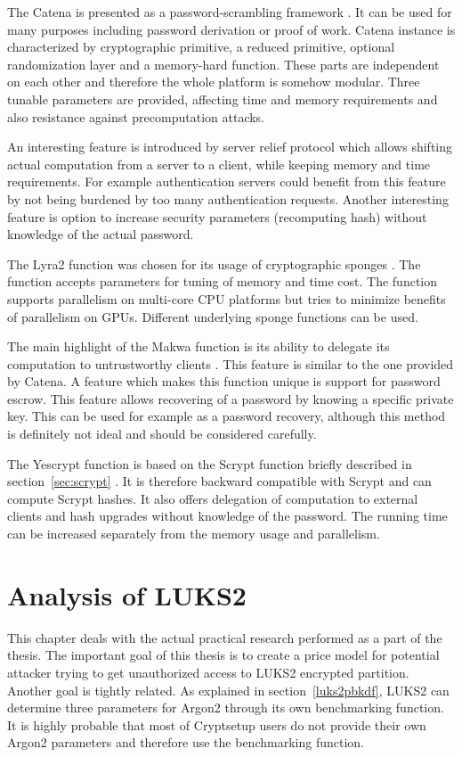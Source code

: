 \documentclass[nolof,digital]{fithesis3}
\begin{document}
The Catena is presented as a password-scrambling framework \parencite{catena}. It can be used for many purposes including password derivation or proof of work. Catena instance is characterized by cryptographic primitive, a reduced primitive, optional randomization layer and a memory-hard function. These parts are independent on each other and therefore the whole platform is somehow modular. Three tunable parameters are provided, affecting time and memory requirements and also resistance against precomputation attacks.

An interesting feature is introduced by server relief protocol which allows shifting actual computation from a server to a client, while keeping memory and time requirements. For example authentication servers could benefit from this feature by not being burdened by too many authentication requests. Another interesting feature is option to increase security parameters (recomputing hash) without knowledge of the actual password.

The Lyra2 function was chosen for its usage of cryptographic sponges \parencite{lyra2}. The function accepts parameters for tuning of memory and time cost. The function supports parallelism on multi-core CPU platforms but tries to minimize benefits of parallelism on GPUs. Different underlying sponge functions can be used.

The main highlight of the Makwa function is its ability to delegate its computation to untrustworthy clients \parencite{maqa}. This feature is similar to the one provided by Catena. A feature which makes this function unique is support for password escrow. This feature allows recovering of a password by knowing a specific private key. This can be used for example as a password recovery, although this method is definitely not ideal and should be considered carefully.

The Yescrypt function is based on the Scrypt function briefly described in section~\ref{sec:scrypt} \parencite{yescrypt}. It is therefore backward compatible with Scrypt and can compute Scrypt hashes. It also offers delegation of computation to external clients and hash upgrades without knowledge of the password. The running time can be increased separately from the memory usage and parallelism.

\chapter{Analysis of LUKS2}
\label{chap:analysis}
This chapter deals with the actual practical research performed as a part of the thesis. The important goal of this thesis is to create a price model for potential attacker trying to get unauthorized access to LUKS2 encrypted partition. Another goal is tightly related. As explained in section~\ref{luks2pbkdf}, LUKS2 can determine three parameters for Argon2 through its own benchmarking function. It is highly probable that most of Cryptsetup users do not provide their own Argon2 parameters and therefore use the benchmarking function.
\end{document}
